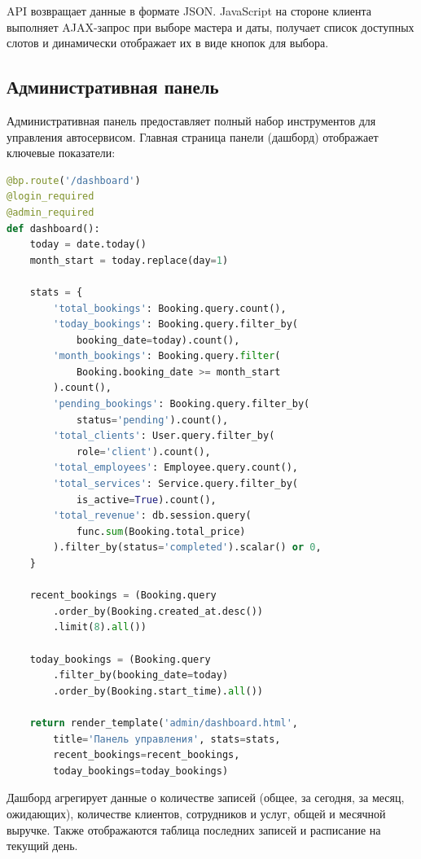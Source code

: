 \documentclass[14pt,a4paper,oneside]{extarticle}
\begin{document}
API возвращает данные в формате JSON. JavaScript на стороне клиента выполняет AJAX-запрос при выборе мастера и даты, получает список доступных слотов и динамически отображает их в виде кнопок для выбора.

\subsection{Административная панель}

Административная панель предоставляет полный набор инструментов для управления автосервисом. Главная страница панели (дашборд) отображает ключевые показатели:

\begin{lstlisting}[language=Python, caption={Дашборд администратора (admin/routes.py)}, label={lst:dashboard}]
@bp.route('/dashboard')
@login_required
@admin_required
def dashboard():
    today = date.today()
    month_start = today.replace(day=1)

    stats = {
        'total_bookings': Booking.query.count(),
        'today_bookings': Booking.query.filter_by(
            booking_date=today).count(),
        'month_bookings': Booking.query.filter(
            Booking.booking_date >= month_start
        ).count(),
        'pending_bookings': Booking.query.filter_by(
            status='pending').count(),
        'total_clients': User.query.filter_by(
            role='client').count(),
        'total_employees': Employee.query.count(),
        'total_services': Service.query.filter_by(
            is_active=True).count(),
        'total_revenue': db.session.query(
            func.sum(Booking.total_price)
        ).filter_by(status='completed').scalar() or 0,
    }

    recent_bookings = (Booking.query
        .order_by(Booking.created_at.desc())
        .limit(8).all())

    today_bookings = (Booking.query
        .filter_by(booking_date=today)
        .order_by(Booking.start_time).all())

    return render_template('admin/dashboard.html',
        title='Панель управления', stats=stats,
        recent_bookings=recent_bookings,
        today_bookings=today_bookings)
\end{lstlisting}

Дашборд агрегирует данные о количестве записей (общее, за сегодня, за месяц, ожидающих), количестве клиентов, сотрудников и услуг, общей и месячной выручке. Также отображаются таблица последних записей и расписание на текущий день.
\end{document}

